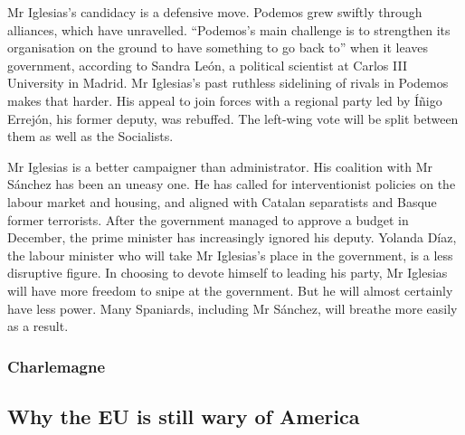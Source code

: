 \documentclass{article}
\begin{document}
Mr Iglesias's candidacy is a defensive move. Podemos grew swiftly through alliances, which have unravelled. ``Podemos's main challenge is to strengthen its organisation on the ground to have something to go back to'' when it leaves government, according to Sandra León, a political scientist at Carlos III University in Madrid. Mr Iglesias's past ruthless sidelining of rivals in Podemos makes that harder. His appeal to join forces with a regional party led by Íñigo Errejón, his former deputy, was rebuffed. The left-wing vote will be split between them as well as the Socialists. 

Mr Iglesias is a better campaigner than administrator. His coalition with Mr Sánchez has been an uneasy one. He has called for interventionist policies on the labour market and housing, and aligned with Catalan separatists and Basque former terrorists. After the government managed to approve a budget in December, the prime minister has increasingly ignored his deputy. Yolanda Díaz, the labour minister who will take Mr Iglesias's place in the government, is a less disruptive figure. In choosing to devote himself to leading his party, Mr Iglesias will have more freedom to snipe at the government. But he will almost certainly have less power. Many Spaniards, including Mr Sánchez, will breathe more easily as a result. {} 
\clearpage
\subsubsection{Charlemagne }
\subsection{Why the EU is still wary of America }
\end{document}
